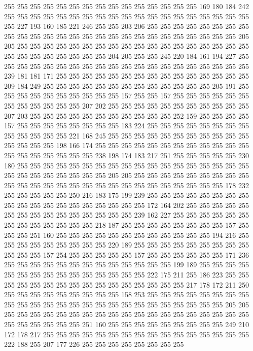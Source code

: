 255 255 255 255 255 255 255 255 255 255 255 255 255 255 255 169 180 184 242 255
255 255 255 255 255 255 255 255 255 255 255 255 255 255 255 255 255 255 255 227
193 160 185 221 246 255 255 203 206 255 255 255 255 255 255 255 255 255 255 255
255 255 255 255 255 255 255 255 255 255 255 255 255 255 255 205 205 255 255 255
255 255 255 255 255 255 255 255 255 255 255 255 255 255 255 255 255 255 255 255
255 255 255 204 205 255 255 245 220 184 161 194 227 255 255 255 255 255 255 255
255 255 255 255 255 255 255 255 255 255 255 255 255 239 181 181 171 255 255 255
255 255 255 255 255 255 255 255 255 255 255 255 209 184 249 255 255 255 255 255
255 255 255 255 255 255 255 255 205 191 255 255 255 255 255 255 255 255 255 255
157 255 255 157 255 255 255 255 255 255 255 255 255 255 255 255 207 202 255 255
255 255 255 255 255 255 255 255 255 207 203 255 255 255 255 255 255 255 255 255
255 255 252 159 255 255 255 255 157 255 255 255 255 255 255 255 255 183 224 255
255 255 255 255 255 255 255 255 255 255 255 255 221 168 245 255 255 255 255 255
255 255 255 255 255 255 255 255 255 255 198 166 174 255 255 255 255 255 255 255
255 255 255 255 255 255 255 255 255 255 255 255 238 198 174 183 217 251 255 255
255 255 255 230 180 255 255 255 255 255 255 255 255 255 255 255 255 255 255 255
255 255 255 255 255 255 255 255 255 255 255 205 205 255 255 255 255 255 255 255
255 255 255 255 255 255 255 255 255 255 255 255 255 255 255 255 255 255 255 178
232 255 255 255 255 255 250 216 183 175 199 239 255 255 255 255 255 255 255 255
255 255 255 255 255 255 255 255 255 255 255 172 164 202 255 255 255 255 255 255
255 255 255 255 255 255 255 255 255 239 162 227 255 255 255 255 255 255 255 255
255 255 255 255 255 218 187 255 255 255 255 255 255 255 255 157 255 255 255 251
160 255 255 255 255 255 255 255 255 255 255 255 255 194 216 255 255 255 255 255
255 255 255 255 220 189 255 255 255 255 255 255 255 255 255 255 255 255 157 254
255 255 255 255 255 157 255 255 255 255 255 255 171 236 255 255 255 255 255 255
255 255 255 255 255 255 255 199 189 255 255 255 255 255 255 255 255 255 255 255
255 255 255 255 222 175 211 255 186 223 255 255 255 255 255 255 255 255 255 255
255 255 255 255 255 255 217 178 172 211 250 255 255 255 255 255 255 255 255 255
158 253 255 255 255 255 255 255 255 255 255 255 255 255 255 255 255 255 255 255
255 255 255 255 255 255 255 205 205 255 255 255 255 255 255 255 255 255 255 255
255 255 255 255 255 255 255 255 255 255 255 255 255 255 251 160 255 255 255 255
255 255 255 255 255 249 210 172 178 217 255 255 255 255 255 255 255 255 255 255
255 255 255 255 255 255 222 188 255 207 177 226 255 255 255 255 255 255 255 255
